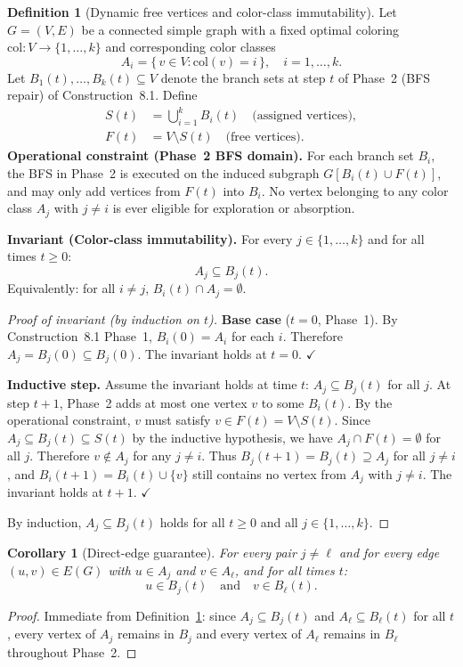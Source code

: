 \documentclass[12pt,a4paper]{article}
\newtheorem{corollary}[theorem]{Corollary}
\theoremstyle{definition}
\newtheorem{definition}[theorem]{Definition}
\begin{document}
\begin{definition}[Dynamic free vertices and color-class immutability]
\label{def:immutability}
Let $G = (V,E)$ be a connected simple graph with a fixed optimal coloring
$\mathrm{col}: V \to \{1,\ldots,k\}$ and corresponding color classes
\[
A_i = \{\, v \in V : \mathrm{col}(v) = i\,\}, \quad i = 1,\ldots,k.
\]
Let $B_1(t),\ldots,B_k(t) \subseteq V$ denote the branch sets at step
$t$ of Phase~2 (BFS repair) of Construction~8.1. Define
\begin{align*}
S(t) &= \bigcup_{i=1}^{k} B_i(t) \quad\text{(assigned vertices)},\\
F(t) &= V \setminus S(t) \quad\text{(free vertices)}.
\end{align*}
\textbf{Operational constraint (Phase~2 BFS domain).}
For each branch set $B_i$, the BFS in Phase~2 is executed on the induced
subgraph $G[B_i(t) \cup F(t)]$, and may only add vertices from $F(t)$
into $B_i$. No vertex belonging to any color class $A_j$ with $j \neq i$
is ever eligible for exploration or absorption.

\textbf{Invariant (Color-class immutability).}
For every $j \in \{1,\ldots,k\}$ and for all times $t \geq 0$:
\[
A_j \subseteq B_j(t).
\]
Equivalently: for all $i \neq j$, $B_i(t) \cap A_j = \emptyset$.
\end{definition}

\begin{proof}[Proof of invariant (by induction on $t$)]
\textbf{Base case} ($t=0$, Phase~1). By Construction~8.1 Phase~1,
$B_i(0) = A_i$ for each $i$. Therefore $A_j = B_j(0) \subseteq B_j(0)$.
The invariant holds at $t=0$. $\checkmark$

\textbf{Inductive step.} Assume the invariant holds at time $t$:
$A_j \subseteq B_j(t)$ for all $j$. At step $t+1$, Phase~2 adds at
most one vertex $v$ to some $B_i(t)$. By the operational constraint,
$v$ must satisfy $v \in F(t) = V \setminus S(t)$. Since
$A_j \subseteq B_j(t) \subseteq S(t)$ by the inductive hypothesis, we
have $A_j \cap F(t) = \emptyset$ for all $j$. Therefore $v \notin A_j$
for any $j \neq i$. Thus $B_j(t+1) = B_j(t) \supseteq A_j$ for all
$j \neq i$, and $B_i(t+1) = B_i(t) \cup \{v\}$ still contains no vertex
from $A_j$ with $j \neq i$. The invariant holds at $t+1$. $\checkmark$

By induction, $A_j \subseteq B_j(t)$ holds for all $t \geq 0$ and all
$j \in \{1,\ldots,k\}$.
\end{proof}

\begin{corollary}[Direct-edge guarantee]
\label{cor:direct-edge}
For every pair $j \neq \ell$ and for every edge $(u,v) \in E(G)$ with
$u \in A_j$ and $v \in A_\ell$, and for all times $t$:
\[
u \in B_j(t) \quad\text{and}\quad v \in B_\ell(t).
\]
\end{corollary}
\begin{proof}
Immediate from Definition~\ref{def:immutability}: since
$A_j \subseteq B_j(t)$ and $A_\ell \subseteq B_\ell(t)$ for all $t$,
every vertex of $A_j$ remains in $B_j$ and every vertex of $A_\ell$
remains in $B_\ell$ throughout Phase~2.
\end{proof}
\end{document}

